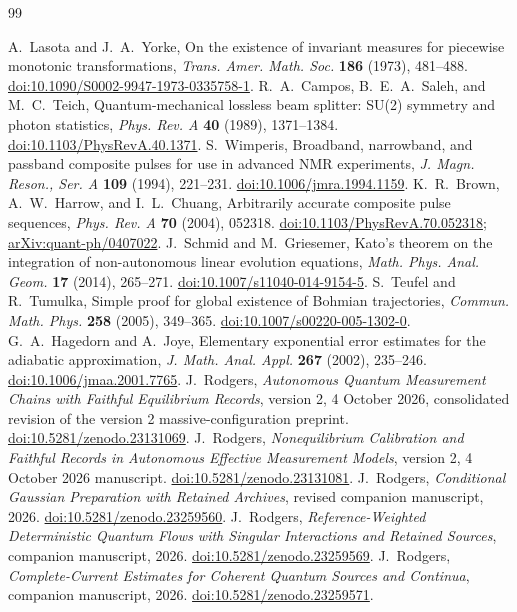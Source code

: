 \documentclass[11pt]{article}
\numberwithin{equation}{section}
\theoremstyle{definition}
\theoremstyle{remark}
\begin{document}
\begin{thebibliography}{99}
\raggedright
{}
A.~Lasota and J.~A.~Yorke, On the existence of invariant measures for piecewise monotonic transformations, \emph{Trans. Amer. Math. Soc.} \textbf{186} (1973), 481--488. \href{https://doi.org/10.1090/S0002-9947-1973-0335758-1}{doi:10.1090/S0002-9947-1973-0335758-1}.
R.~A.~Campos, B.~E.~A.~Saleh, and M.~C.~Teich, Quantum-mechanical lossless beam splitter: SU(2) symmetry and photon statistics, \emph{Phys. Rev. A} \textbf{40} (1989), 1371--1384. \href{https://doi.org/10.1103/PhysRevA.40.1371}{doi:10.1103/PhysRevA.40.1371}.
S.~Wimperis, Broadband, narrowband, and passband composite pulses for use in advanced NMR experiments, \emph{J. Magn. Reson., Ser. A} \textbf{109} (1994), 221--231. \href{https://doi.org/10.1006/jmra.1994.1159}{doi:10.1006/jmra.1994.1159}.
K.~R.~Brown, A.~W.~Harrow, and I.~L.~Chuang, Arbitrarily accurate composite pulse sequences, \emph{Phys. Rev. A} \textbf{70} (2004), 052318. \href{https://doi.org/10.1103/PhysRevA.70.052318}{doi:10.1103/PhysRevA.70.052318}; \href{https://arxiv.org/abs/quant-ph/0407022}{arXiv:quant-ph/0407022}.
J.~Schmid and M.~Griesemer, Kato's theorem on the integration of non-autonomous linear evolution equations, \emph{Math. Phys. Anal. Geom.} \textbf{17} (2014), 265--271. \href{https://doi.org/10.1007/s11040-014-9154-5}{doi:10.1007/s11040-014-9154-5}.
S.~Teufel and R.~Tumulka, Simple proof for global existence of Bohmian trajectories, \emph{Commun. Math. Phys.} \textbf{258} (2005), 349--365. \href{https://doi.org/10.1007/s00220-005-1302-0}{doi:10.1007/s00220-005-1302-0}.
G.~A.~Hagedorn and A.~Joye, Elementary exponential error estimates for the adiabatic approximation, \emph{J. Math. Anal. Appl.} \textbf{267} (2002), 235--246. \href{https://doi.org/10.1006/jmaa.2001.7765}{doi:10.1006/jmaa.2001.7765}.
J.~Rodgers, \emph{Autonomous Quantum Measurement Chains with Faithful Equilibrium Records}, version 2, 4 October 2026, consolidated revision of the version 2 massive-configuration preprint. \href{https://doi.org/10.5281/zenodo.23131069}{doi:10.5281/zenodo.23131069}.
J.~Rodgers, \emph{Nonequilibrium Calibration and Faithful Records in Autonomous Effective Measurement Models}, version 2, 4 October 2026 manuscript. \href{https://doi.org/10.5281/zenodo.23131081}{doi:10.5281/zenodo.23131081}.
J.~Rodgers, \emph{Conditional Gaussian Preparation with Retained Archives}, revised companion manuscript, 2026. \href{https://doi.org/10.5281/zenodo.23259560}{doi:10.5281/zenodo.23259560}.
J.~Rodgers, \emph{Reference-Weighted Deterministic Quantum Flows with Singular Interactions and Retained Sources}, companion manuscript, 2026. \href{https://doi.org/10.5281/zenodo.23259569}{doi:10.5281/zenodo.23259569}.
J.~Rodgers, \emph{Complete-Current Estimates for Coherent Quantum Sources and Continua}, companion manuscript, 2026. \href{https://doi.org/10.5281/zenodo.23259571}{doi:10.5281/zenodo.23259571}.
\end{thebibliography}
\end{document}
